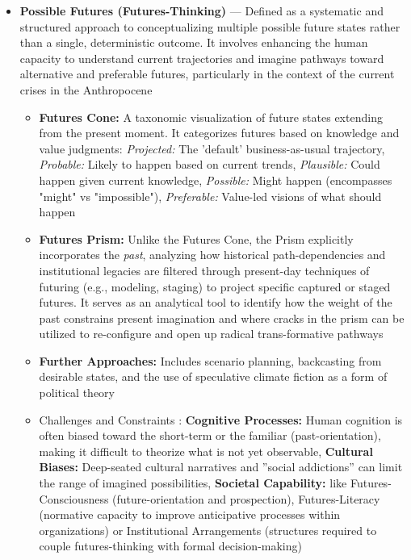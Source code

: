 \documentclass[jou,floatsintext]{apa7}
\begin{document}
\begin{itemize}
\begin{itemize}
    \item \textbf{Possible Futures (Futures-Thinking)} --- Defined as a systematic and structured approach to conceptualizing multiple possible future states rather than a single, deterministic outcome. It involves enhancing the human capacity to understand current trajectories and imagine pathways toward alternative and preferable futures, particularly in the context of the current crises in the Anthropocene \parencite{corkExploringAlternativeFutures2023, gumusayImaginingDesirableFutures2024}
    \begin{itemize}
        \item[$\rightarrow$] \textbf{Futures Cone:} A taxonomic visualization of future states extending from the present moment. It categorizes futures based on knowledge and value judgments: \textit{Projected:} The 'default' business-as-usual trajectory, \textit{Probable:} Likely to happen based on current trends, \textit{Plausible:} Could happen given current knowledge, \textit{Possible:} Might happen (encompasses "might" vs "impossible"), \textit{Preferable:} Value-led visions of what should happen \parencite{corkExploringAlternativeFutures2023}
        \item[$\rightarrow$] \textbf{Futures Prism:} Unlike the Futures Cone, the Prism explicitly incorporates the \textit{past}, analyzing how historical path-dependencies and institutional legacies are filtered through present-day techniques of futuring (e.g., modeling, staging) to project specific captured or staged futures. It serves as an analytical tool to identify how the weight of the past constrains present imagination and where cracks in the prism can be utilized to re-configure and open up radical trans-formative pathways \parencite{hajerCapturedFuturesRethinking2025}
        \item[$\rightarrow$] \textbf{Further Approaches:} Includes scenario planning, backcasting from desirable states, and the use of speculative climate fiction as a form of political theory \parencite{corkExploringAlternativeFutures2023, hatzisavvidouEnvisioningEcopoliticalFutures2024}
        \item Challenges and Constraints \parencite{corkExploringAlternativeFutures2023}: \textbf{Cognitive Processes:} Human cognition is often biased toward the short-term or the familiar (past-orientation), making it difficult to theorize what is not yet observable, \textbf{Cultural Biases:} Deep-seated cultural narratives and ''social addictions'' can limit the range of imagined possibilities, \textbf{Societal Capability:} like Futures-Consciousness (future-orientation and prospection), Futures-Literacy (normative capacity to improve anticipative processes within organizations) or Institutional Arrangements (structures required to couple futures-thinking with formal decision-making)

\end{itemize}
\end{itemize}
\end{itemize}
\end{document}
